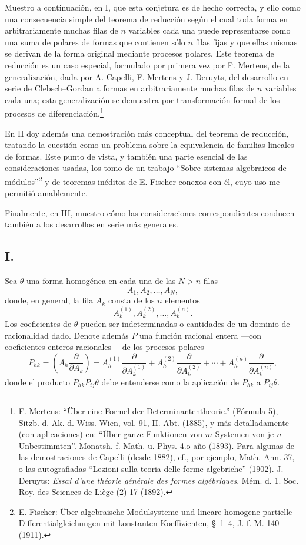 \documentclass[11pt]{article}
\begin{document}
Muestro a continuación, en I, que esta conjetura es de hecho correcta, y ello como una consecuencia simple del teorema de reducción según el cual toda forma en arbitrariamente muchas filas de $n$ variables cada una puede representarse como una suma de polares de formas que contienen sólo $n$ filas fijas y que ellas mismas se derivan de la forma original mediante procesos polares. Este teorema de reducción es un caso especial, formulado por primera vez por F. Mertens, de la generalización, dada por A. Capelli, F. Mertens y J. Deruyts, del desarrollo en serie de Clebsch--Gordan a formas en arbitrariamente muchas filas de $n$ variables cada una; esta generalización se demuestra por transformación formal de los procesos de diferenciación.\footnote{F. Mertens: ``Über eine Formel der Determinantentheorie.'' (Fórmula 5), Sitzb. d. Ak. d. Wiss. Wien, vol. 91, II. Abt. (1885), y más detalladamente (con aplicaciones) en: ``Über ganze Funktionen von $m$ Systemen von je $n$ Unbestimmten''. Monatsh. f. Math. u. Phys. 4.o año (1893). Para algunas de las demostraciones de Capelli (desde 1882), cf., por ejemplo, Math. Ann. 37, o las autografiadas ``Lezioni sulla teoria delle forme algebriche'' (1902). J. Deruyts: \emph{Essai d'une théorie générale des formes algébriques}, Mém. d. 1. Soc. Roy. des Sciences de Liège (2) 17 (1892).}

En II doy además una demostración más conceptual del teorema de reducción, tratando la cuestión como un problema sobre la equivalencia de familias lineales de formas. Este punto de vista, y también una parte esencial de las consideraciones usadas, los tomo de un trabajo ``Sobre sistemas algebraicos de módulos''\footnote{E. Fischer: Über algebraische Modulsysteme und lineare homogene partielle Differentialgleichungen mit konstanten Koeffizienten, \S\ 1--4, J. f. M. 140 (1911).} y de teoremas inéditos de E. Fischer conexos con él, cuyo uso me permitió amablemente.

Finalmente, en III, muestro cómo las consideraciones correspondientes conducen también a los desarrollos en serie más generales.

\subsection*{I.}
Sea $\theta$ una forma homogénea en cada una de las $N>n$ filas
\[
  A_1,A_2,\ldots,A_N,
\]
donde, en general, la fila $A_k$ consta de los $n$ elementos
\[
  A_k^{(1)},A_k^{(2)},\ldots,A_k^{(n)}.
\]
Los coeficientes de $\theta$ pueden ser indeterminadas o cantidades de un dominio de racionalidad dado. Denote además $P$ una función racional entera ---con coeficientes enteros racionales--- de los procesos polares
\[
  P_{hk}=\left(A_h\frac{\partial}{\partial A_k}\right)
  =A_h^{(1)}\frac{\partial}{\partial A_k^{(1)}}+
   A_h^{(2)}\frac{\partial}{\partial A_k^{(2)}}+
   \cdots+
   A_h^{(n)}\frac{\partial}{\partial A_k^{(n)}},
\]
donde el producto $P_{hk}P_{ij}\theta$ debe entenderse como la aplicación de $P_{hk}$ a $P_{ij}\theta$.
\end{document}
